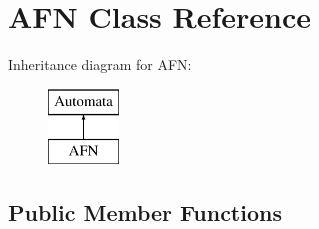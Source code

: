 \hypertarget{class_a_f_n}{}\section{A\+FN Class Reference}
\label{class_a_f_n}
Inheritance diagram for A\+FN\+:\begin{figure}[H]
\begin{center}
\leavevmode
\includegraphics[height=2.000000cm]{class_a_f_n}
\end{center}
\end{figure}
\subsection*{Public Member Functions}
